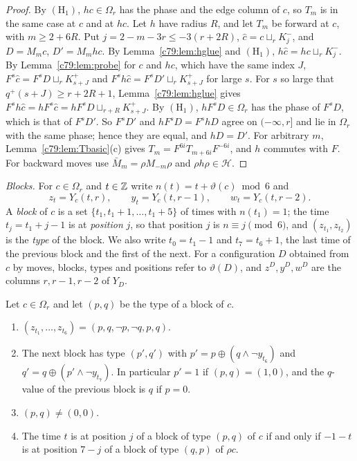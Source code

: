\begin{proof}
By $(\mathrm H_1)$, $hc\in\Omega_r$ has the phase and the edge column of $c$, so $T_m$ is in the same case at $c$ and at $hc$. Let $h$ have radius $R$, and let $T_m$ be forward at $c$, with $m\ge2+6R$. Put $j=2-m-3r\le-3(r+2R)$, $\hat c=c\sqcup_rK^-_j$, and $D=M_mc$, $D'=M_mhc$. By Lemma~\ref{c79:lem:hglue} and $(\mathrm H_1)$, $h{\hat c}=hc\sqcup_rK^-_j$. By Lemma~\ref{c79:lem:probe} for $c$ and $hc$, which have the same index $J$, $F^s{\hat c}=F^sD\sqcup_rK^+_{s+J}$ and $F^sh{\hat c}=F^sD'\sqcup_rK^+_{s+J}$ for large $s$. For $s$ so large that $q^+(s+J)\ge r+2R+1$, Lemma~\ref{c79:lem:hglue} gives $F^sh{\hat c}=hF^s{\hat c}=hF^sD\sqcup_{r+R}K^+_{s+J}$. By $(\mathrm H_1)$, $hF^sD\in\Omega_r$ has the phase of $F^sD$, which is that of $F^sD'$. So $F^sD'$ and $hF^sD=F^shD$ agree on $(-\infty,r]$ and lie in $\Omega_r$ with the same phase; hence they are equal, and $hD=D'$. For arbitrary $m$, Lemma~\ref{c79:lem:Tbasic}(c) gives $T_m=F^{6i}T_{m+6i}F^{-6i}$, and $h$ commutes with $F$. For backward moves use $\bar M_m=\rho M_{-m}\rho$ and $\rho h\rho\in\mathcal H$.
\end{proof}

\emph{Blocks.} For $c\in\Omega_r$ and $t\in\mathbb{Z}$ write $n(t)=t+\vartheta(c)\bmod 6$ and
\[
z_t=Y_c(t,r),\qquad y_t=Y_c(t,r-1),\qquad w_t=Y_c(t,r-2).
\]
A \emph{block} of $c$ is a set $\{t_1,t_1+1,\dots,t_1+5\}$ of times with $n(t_1)=1$; the time $t_j=t_1+j-1$ is at \emph{position} $j$, so that position $j$ is $n\equiv j\pmod 6$, and $(z_{t_1},z_{t_2})$ is the \emph{type} of the block. We also write $t_0=t_1-1$ and $t_7=t_6+1$, the last time of the previous block and the first of the next. For a configuration $D$ obtained from $c$ by moves, blocks, types and positions refer to $\vartheta(D)$, and $z^D,y^D,w^D$ are the columns $r,r-1,r-2$ of $Y_D$.

\begin{lemma}[blocks]\label{c79:lem:blocks}
Let $c\in\Omega_r$ and let $(p,q)$ be the type of a block of $c$.
\begin{enumerate}
\item[(a)] $(z_{t_1},\dots,z_{t_6})=(p,q,\neg p,\neg q,p,q)$.
\item[(b)] The next block has type $(p',q')$ with $p'=p\oplus(q\wedge\neg y_{t_6})$ and $q'=q\oplus(p'\wedge\neg y_{t_7})$. In particular $p'=1$ if $(p,q)=(1,0)$, and the $q$-value of the previous block is $q$ if $p=0$.
\item[(c)] $(p,q)\ne(0,0)$.
\item[(d)] The time $t$ is at position $j$ of a block of type $(p,q)$ of $c$ if and only if $-1-t$ is at position $7-j$ of a block of type $(q,p)$ of $\rho c$.
\end{enumerate}
\end{lemma}

